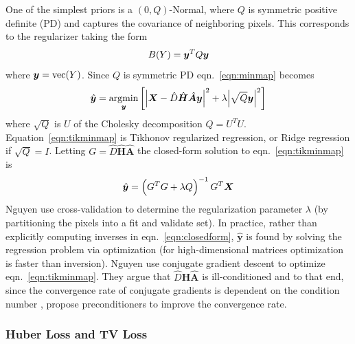 One of the simplest priors is a \((0, Q)\)-Normal, where \(Q\) is symmetric positive definite (PD) and captures the covariance of neighboring pixels.
%
This corresponds to the regularizer taking the form
\begin{equation}
    B(Y) = \bm{y} ^T Q \bm{y}
\end{equation}
where \(\bm{y} = \text{vec}(Y)\).
%
Since \(Q\) is symmetric PD eqn.~\eqref{eqn:minmap} becomes
\begin{equation}
    \hat{\bm{y}} = \underset{\bm{y}}{\text{argmin}}\left[ \abs{ \bm{X} - \hat{D} \hat{\bm{H}} \hat{\bm{A}} \bm{y} }^2 +\lambda \abs{ \sqrt{Q}\bm{y} }^2 \right]
    \label{eqn:tikminmap}
\end{equation}
where \(\sqrt{Q}\) is \(U\) of the Cholesky decomposition \(Q = U^T U\).
%
Equation~\ref{eqn:tikminmap} is Tikhonov regularized regression, or Ridge regression if \(\sqrt{Q} = I\).
%
Letting \(G = \hat{D} \hat{\bm{H}} \hat{\bm{A}}\) the closed-form solution to eqn.~\eqref{eqn:tikminmap} is
\begin{equation}
    \hat{\bm{y}} = \left( G^T G + \lambda Q \right)^{-1} G^T\bm{X}
    \label{eqn:closedform}
\end{equation}
Nguyen \etal \cite{milanfar2001} use cross-validation to determine the regularization parameter \(\lambda\) (by partitioning the pixels into a fit and validate set).
%
In practice, rather than explicitly computing inverses in eqn.~\eqref{eqn:closedform}, \(\hat{\bm{y}}\) is found by solving the regression problem via optimization (for high-dimensional matrices optimization is faster than inversion).
%
Nguyen \etal use conjugate gradient descent to optimize eqn.~\eqref{eqn:tikminmap}.
%
They argue that \(\hat{D} \hat{\bm{H}} \hat{\bm{A}}\) is ill-conditioned and to that end, since the convergence rate of conjugate gradients is dependent on the condition number \cite{vanderSluis1986}, propose preconditioners to improve the convergence rate.

\subsubsection{Huber Loss and TV Loss}\label{subsubsec:huberloss}


